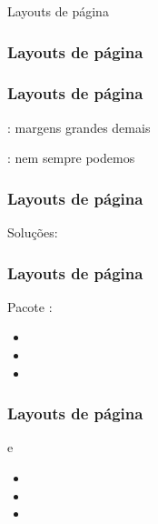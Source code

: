 \begin{frame}[standout]
  \Huge
  Layouts de página
\end{frame}

\begin{frame}
  \frametitle{Layouts de página}
  \Large
  \huge
\end{frame}

\begin{frame}
  \frametitle{Layouts de página}
  \huge
  : margens grandes demais

  : nem sempre podemos
\end{frame}

\begin{frame}
  \frametitle{Layouts de página}
  \huge
  Soluções:
  \begin{itemize}
  \end{itemize}
\end{frame}

\begin{frame}
  \frametitle{Layouts de página}
  \huge
  Pacote :

  \begin{itemize}
    \item {}
    \item {}
    \item {}
  \end{itemize}
\end{frame}

\begin{frame}
  \frametitle{Layouts de página}
  \huge
   e 

  \begin{itemize}
    \item {}
    \item {}
    \item {}
  \end{itemize}
\end{frame}

